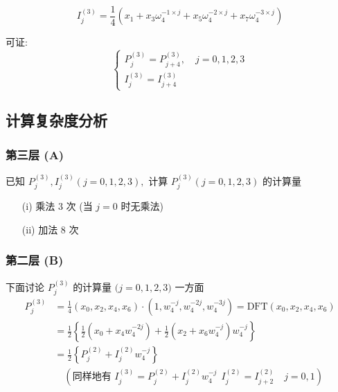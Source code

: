\documentclass[linespread=1.5,openany]{book}%
\theoremstyle{plain}
\begin{document}
{{{					\begin{equation}
						I_j^{(3)} = \frac{1}{4} \left( x_1 + x_3 \omega_4^{-1 \times j} + x_5 \omega_4^{-2 \times j} + x_7 \omega_4^{-3 \times j} \right)
					\end{equation}
					
					可证:
					\begin{equation}
						\begin{cases}
							P_j^{(3)} = P_{j+4}^{(3)}, \quad j = 0, 1, 2, 3 \\[8pt]
							I_j^{(3)} = I_{j+4}^{(3)}
						\end{cases}
					\end{equation}
					
					\subsection{计算复杂度分析}
					
					\subsubsection{第三层 (A)}
					
					
					$	\text{已知 } P_{j}^{(3)}, I_{j}^{(3)} (j=0,1,2,3), \text{ 计算 } P_{j}^{(3)} (j=0,1,2,3) \text{ 的计算量}$
					
					
					\begin{itemize}
						\item[(i)] 乘法 3 次 (当 $j=0$ 时无乘法)
						\item[(ii)] 加法 8 次
					\end{itemize}
					
					\subsubsection{第二层 (B)}
					$\text{下面讨论 } P_{j}^{(3)} \text{ 的计算量 (} j=0,1,2,3 \text{)}$
					一方面
					\begin{equation}
						\begin{aligned}
							P_{j}^{(3)} &= \frac{1}{4} \left( x_{0}, x_{2}, x_{4}, x_{6} \right) \cdot (1, w_{4}^{-j}, w_{4}^{-2j}, w_{4}^{-3j}) = \text{DFT} \left( x_{0}, x_{2}, x_{4}, x_{6} \right) \\[8pt]
							&= \frac{1}{2} \left\{ \frac{1}{2} \left( x_{0} + x_{4} w_{4}^{-2j} \right) + \frac{1}{2} \left( x_{2} + x_{6} w_{4}^{-j} \right) w_{4}^{-j} \right\} \\[8pt]
							&= \frac{1}{2} \left\{ P_{j}^{(2)} + I_{j}^{(2)} w_{4}^{-j} \right\} \\
							&\quad ( \text{同样地有 } I_{j}^{(3)} = P_{j}^{(2)} + I_{j}^{(2)} w_{4}^{-j} \ \ I_j^{(2)}=I_{j+2} ^{(2)}\quad j=0,1 )
						\end{aligned}
					\end{equation}
					
}}}
\end{document}
